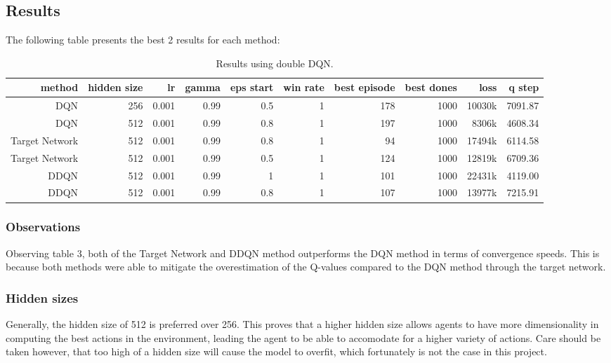 \subsection{Results}

The following table presents the best 2 results for each method:

\begin{table}[h]
	\centering
	\scriptsize
	\begin{tabular}{r r r r | r r r r r r}
		\toprule
  method & hidden size & lr & gamma & eps start & win rate & best episode & best dones & loss & q step \\
  \midrule
  DQN & 256 & 0.001 & 0.99 & 0.5 & 1 & 178 & 1000 & 10030k & 7091.87 \\
  DQN & 512 & 0.001 & 0.99 & 0.8 & 1 & 197 & 1000 & 8306k & 4608.34 \\
  Target Network & 512 & 0.001 & 0.99 & 0.8 & 1 & 94 & 1000 & 17494k & 6114.58 \\
  Target Network & 512 & 0.001 & 0.99 & 0.5 & 1 & 124 & 1000 & 12819k & 6709.36 \\
  DDQN & 512 & 0.001 & 0.99 & 1 & 1 & 101 & 1000 & 22431k & 4119.00 \\
  DDQN & 512 & 0.001 & 0.99 & 0.8 & 1 & 107 & 1000 & 13977k & 7215.91 \\
  \bottomrule
  \end{tabular}
	\caption{Results using double DQN.}
	\label{best_results_t2}
\end{table}


\subsubsection{Observations}
Observing table 3, both of the Target Network and DDQN method outperforms the DQN method in terms of convergence speeds. This is because both methods were able to mitigate the overestimation of the Q-values compared to the DQN method through the target network.

\subsubsection{Hidden sizes}
Generally, the hidden size of 512 is preferred over 256. This proves that a higher hidden size allows agents to have more dimensionality in computing the best actions in the environment, leading the agent to be able to accomodate for a higher variety of actions. Care should be taken however, that too high of a hidden size will cause the model to overfit, which fortunately is not the case in this project.

